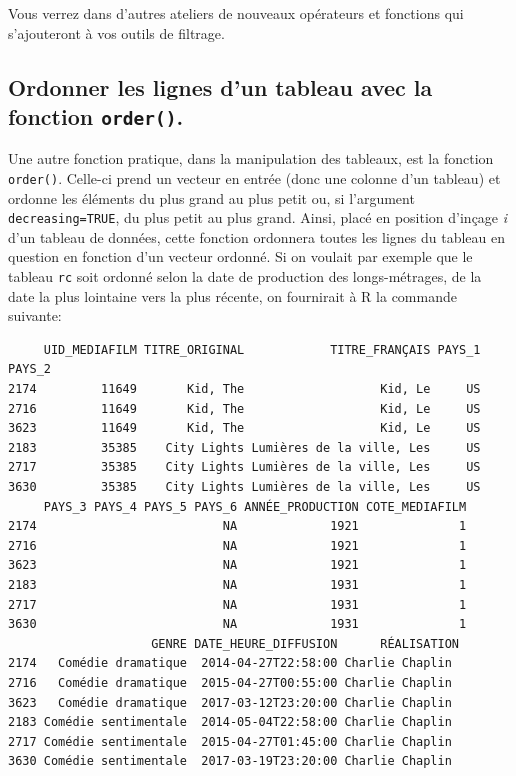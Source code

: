 \documentclass[
  letterpaper,
  DIV=11,
  numbers=noendperiod]{scrartcl}
\newenvironment{Shaded}{\begin{snugshade}}{\end{snugshade}}
\newcommand{\FunctionTok}[1]{\textcolor[rgb]{0.28,0.35,0.67}{#1}}
\newcommand{\NormalTok}[1]{\textcolor[rgb]{0.00,0.23,0.31}{#1}}
\newcommand{\SpecialCharTok}[1]{\textcolor[rgb]{0.37,0.37,0.37}{#1}}
\begin{document}
Vous verrez dans d'autres ateliers de nouveaux opérateurs et fonctions
qui s'ajouteront à vos outils de filtrage.

\hypertarget{ordonner-les-lignes-dun-tableau-avec-la-fonction-order.}{%
\subsection{\texorpdfstring{Ordonner les lignes d'un tableau avec la
fonction
\texttt{order()}.}{Ordonner les lignes d'un tableau avec la fonction order().}}\label{ordonner-les-lignes-dun-tableau-avec-la-fonction-order.}}

Une autre fonction pratique, dans la manipulation des tableaux, est la
fonction \texttt{order()}. Celle-ci prend un vecteur en entrée (donc une
colonne d'un tableau) et ordonne les éléments du plus grand au plus
petit ou, si l'argument \texttt{decreasing=TRUE}, du plus petit au plus
grand. Ainsi, placé en position d'inçage \emph{i} d'un tableau de
données, cette fonction ordonnera toutes les lignes du tableau en
question en fonction d'un vecteur ordonné. Si on voulait par exemple que
le tableau \texttt{rc} soit ordonné selon la date de production des
longs-métrages, de la date la plus lointaine vers la plus récente, on
fournirait à R la commande suivante:

\begin{Shaded}
\end{Shaded}

\begin{verbatim}
     UID_MEDIAFILM TITRE_ORIGINAL            TITRE_FRANÇAIS PAYS_1 PAYS_2
2174         11649       Kid, The                   Kid, Le     US       
2716         11649       Kid, The                   Kid, Le     US       
3623         11649       Kid, The                   Kid, Le     US       
2183         35385    City Lights Lumières de la ville, Les     US       
2717         35385    City Lights Lumières de la ville, Les     US       
3630         35385    City Lights Lumières de la ville, Les     US       
     PAYS_3 PAYS_4 PAYS_5 PAYS_6 ANNÉE_PRODUCTION COTE_MEDIAFILM
2174                          NA             1921              1
2716                          NA             1921              1
3623                          NA             1921              1
2183                          NA             1931              1
2717                          NA             1931              1
3630                          NA             1931              1
                    GENRE DATE_HEURE_DIFFUSION      RÉALISATION
2174   Comédie dramatique  2014-04-27T22:58:00 Charlie Chaplin 
2716   Comédie dramatique  2015-04-27T00:55:00 Charlie Chaplin 
3623   Comédie dramatique  2017-03-12T23:20:00 Charlie Chaplin 
2183 Comédie sentimentale  2014-05-04T22:58:00 Charlie Chaplin 
2717 Comédie sentimentale  2015-04-27T01:45:00 Charlie Chaplin 
3630 Comédie sentimentale  2017-03-19T23:20:00 Charlie Chaplin 
\end{verbatim}
\end{document}
